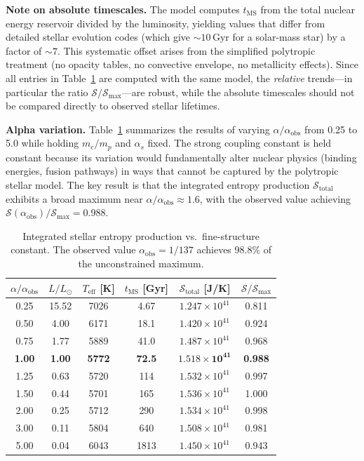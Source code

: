 \documentclass[12pt,a4paper]{article}
\theoremstyle{remark}
\begin{document}
\textbf{Note on absolute timescales.} The model computes $t_{\text{MS}}$ from the total nuclear energy reservoir divided by the luminosity, yielding values that differ from detailed stellar evolution codes (which give ${\sim}10\,$Gyr for a solar-mass star) by a factor of ${\sim}7$. This systematic offset arises from the simplified polytropic treatment (no opacity tables, no convective envelope, no metallicity effects). Since all entries in Table~\ref{tab:alpha_scan} are computed with the same model, the \emph{relative} trends---in particular the ratio $\mathcal{S}/\mathcal{S}_{\text{max}}$---are robust, while the absolute timescales should not be compared directly to observed stellar lifetimes.

\textbf{Alpha variation.} Table~\ref{tab:alpha_scan} summarizes the results of varying $\alpha / \alpha_{\text{obs}}$ from 0.25 to 5.0 while holding $m_e/m_p$ and $\alpha_s$ fixed. The strong coupling constant is held constant because its variation would fundamentally alter nuclear physics (binding energies, fusion pathways) in ways that cannot be captured by the polytropic stellar model. The key result is that the integrated entropy production $\mathcal{S}_{\text{total}}$ exhibits a broad maximum near $\alpha / \alpha_{\text{obs}} \approx 1.6$, with the observed value achieving $\mathcal{S}(\alpha_{\text{obs}}) / \mathcal{S}_{\text{max}} = 0.988$.

\begin{table}[ht]
\centering
\caption{Integrated stellar entropy production vs.\ fine-structure constant. The observed value $\alpha_{\text{obs}} = 1/137$ achieves 98.8\% of the unconstrained maximum.}
\label{tab:alpha_scan}
\begin{tabular}{cccccc}
\toprule
$\alpha / \alpha_{\text{obs}}$ & $L / L_\odot$ & $T_{\text{eff}}$ [K] & $t_{\text{MS}}$ [Gyr] & $\mathcal{S}_{\text{total}}$ [J/K] & $\mathcal{S} / \mathcal{S}_{\text{max}}$ \\
\midrule
0.25 & 15.52 & 7026 & 4.67 & $1.247 \times 10^{41}$ & 0.811 \\
0.50 & 4.00 & 6171 & 18.1 & $1.420 \times 10^{41}$ & 0.924 \\
0.75 & 1.77 & 5889 & 41.0 & $1.487 \times 10^{41}$ & 0.968 \\
\textbf{1.00} & \textbf{1.00} & \textbf{5772} & \textbf{72.5} & $\mathbf{1.518 \times 10^{41}}$ & \textbf{0.988} \\
1.25 & 0.63 & 5720 & 114 & $1.532 \times 10^{41}$ & 0.997 \\
1.50 & 0.44 & 5701 & 165 & $1.536 \times 10^{41}$ & 1.000 \\
2.00 & 0.25 & 5712 & 290 & $1.534 \times 10^{41}$ & 0.998 \\
3.00 & 0.11 & 5804 & 640 & $1.508 \times 10^{41}$ & 0.981 \\
5.00 & 0.04 & 6043 & 1813 & $1.450 \times 10^{41}$ & 0.943 \\
\bottomrule
\end{tabular}
\end{table}
\end{document}
